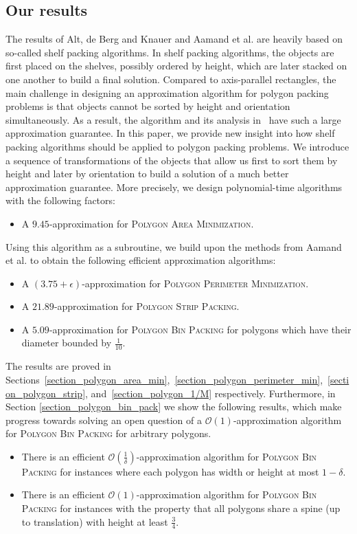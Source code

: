 \documentclass[a4paper,UKenglish,cleveref, autoref, thm-restate]{lipics_v2021}
\begin{document}
\subsection{Our results}
The results of Alt, de Berg and Knauer \cite{alt_17,alt_17_corrigendum} and Aamand et al. \cite{aamand_23} are heavily based on so-called shelf packing algorithms. In shelf packing algorithms, the objects are first placed on the shelves, possibly ordered by height, which are later stacked on one another to build a final solution. Compared to axis-parallel rectangles, the main challenge in designing an approximation algorithm for polygon packing problems is that objects cannot be sorted by height and orientation simultaneously. As a result, the algorithm and its analysis in~\cite{alt_17,alt_17_corrigendum} have such a large approximation guarantee. In this paper, we provide new insight into how shelf packing algorithms should be applied to polygon packing problems. We introduce a sequence of transformations of the objects that allow us first to sort them by height and later by orientation to build a solution of a much better approximation guarantee. More precisely, we design polynomial-time algorithms with the following factors:
\begin{itemize}
    \item A $9.45$-approximation for \textsc{Polygon Area Minimization}.
\end{itemize}
Using this algorithm as a subroutine, we build upon the methods from Aamand et al. \cite{aamand_23} to obtain the following efficient approximation algorithms:
\begin{itemize}
    \item A $(3.75+\epsilon)$-approximation for \textsc{Polygon Perimeter Minimization}.
    \item A $21.89$-approximation for \textsc{Polygon Strip Packing}.
    \item A $5.09$-approximation for \textsc{Polygon Bin Packing} for polygons which have their diameter bounded by $\frac{1}{10}$.
\end{itemize}

The results are proved in Sections~\ref{section_polygon_area_min},~\ref{section_polygon_perimeter_min},~\ref{section_polygon_strip}, and~\ref{section_polygon_1/M} respectively.
%
Furthermore, in Section \ref{section_polygon_bin_pack} we show the following results, which make progress towards solving an open question of a $\mathcal{O}(1)$-approximation algorithm for \textsc{Polygon Bin Packing} for arbitrary polygons.
\begin{itemize}
    \item There is an efficient $\mathcal{O}(\frac{1}{\delta})$-approximation algorithm for \textsc{Polygon Bin Packing} for instances where each polygon has width or height at most $1-\delta$.
    \item There is an efficient $\mathcal{O}(1)$-approximation algorithm for \textsc{Polygon Bin Packing} for instances with the property that all polygons share a spine (up to translation) with height at least $\frac{3}{4}$.
\end{itemize}
\end{document}
